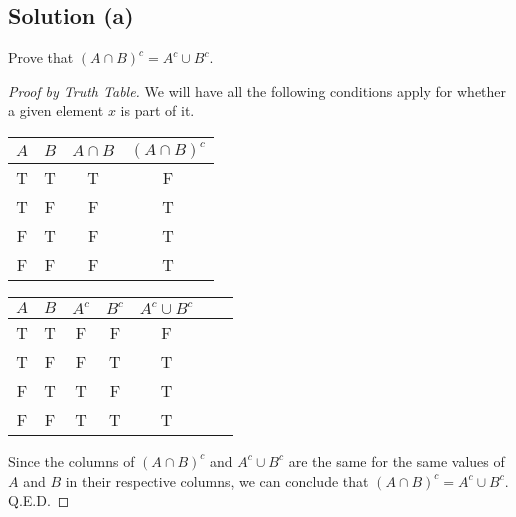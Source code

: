 \documentclass[12pt]{report}
\begin{document}
\subsection{Solution (a)}
Prove that $(A \cap B)^c = A^c \cup B^c$.
\begin{proof}[Proof by Truth Table]
    We will have all the following conditions apply for whether a given element $x$ is part of it.
    \begin{center}
        \begin{tabular}{| c | c | c | c |}
            \hline
            $A$ &$B$    &$A \cap B$ &$(A \cap B)^c$\\
            \hline
            T   &T  &T  &F\\
            T   &F  &F  &T\\
            F   &T  &F  &T\\
            F   &F  &F  &T\\
            \hline
        \end{tabular}
        \begin{tabular}{| c | c | c | c | c | c | c |}
            \hline
            $A$ &$B$    &$A^c$  &$B^c$  &$A^c \cup B^c$\\
            \hline
            T   &T  &F  &F  &F\\
            T   &F  &F  &T  &T\\
            F   &T  &T  &F  &T\\
            F   &F  &T  &T  &T\\
            \hline
        \end{tabular}
    \end{center}

    Since the columns of $(A \cap B)^c$ and $A^c \cup B^c$ are the same for the same values of $A$ and $B$ in their respective columns, we can conclude that $(A \cap B)^c = A^c \cup B^c$.\\
    Q.E.D.
\end{proof}
\end{document}
